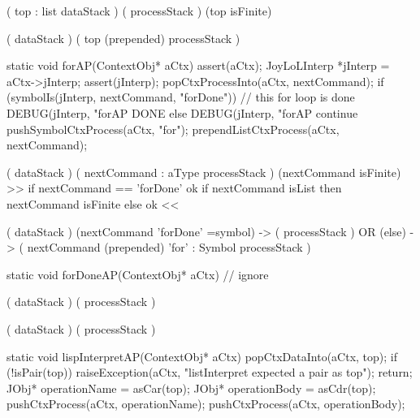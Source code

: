 \starttyping

\startWord[interpret]

\preDataStack
  (
    top : list
    dataStack
  )
\preProcessStack
  (
    processStack
  )
\preConditions
  (top isFinite)
\stopPreStack

\postDataStack
  (
    dataStack
  )
\postProcessStack
  (
    top (prepended)
    processStack
  )
\postConditions
\stopPostStack

\stopWord

\stoptyping

\startCCode
static void forAP(ContextObj* aCtx) {
  assert(aCtx);
  JoyLoLInterp *jInterp = aCtx->jInterp;
  assert(jInterp);
  popCtxProcessInto(aCtx, nextCommand);
  if (symbolIs(jInterp, nextCommand, "forDone")) {
    // this for loop is done
    DEBUG(jInterp, "forAP DONE%
  } else {
    DEBUG(jInterp, "forAP continue%
    pushSymbolCtxProcess(aCtx, "for");
    prependListCtxProcess(aCtx, nextCommand);
  }
}
\stopCCode

\starttyping

\startWord[for]
\preDataStack
  (
    dataStack
  )
\preProcessStack
  (
    nextCommand : aType
    processStack
  )
\preConditions
  (nextCommand isFinite)  >> if nextCommand == 'forDone' ok
                             if nextCommand isList then nextCommand isFinite
                             else ok <<
\stopPreStack

\postDataStack
  (
    dataStack
  )
\postProcessStack
  (nextCommand 'forDone' =symbol) -> (
    processStack
  )
  OR
  (else) -> (
    nextCommand (prepended)
    'for' : Symbol
    processStack
  )
\postConditions
\stopPostStack

\stopWord

\stoptyping

\startCCode
static void forDoneAP(ContextObj* aCtx) {
  // ignore
}
\stopCCode

\starttyping

\startWord[forDone]

\preDataStack
  ( dataStack )
\preProcessStack
  ( processStack )
\preConditions
\stopPreStack

\postDataStack
  ( dataStack )
\postProcessStack
  ( processStack )
\postConditions
\stopPostStack

\stopWord

\stoptyping

\startCCode
static void lispInterpretAP(ContextObj* aCtx) {
  popCtxDataInto(aCtx, top);
  if (!isPair(top)) {
    raiseException(aCtx,
      "listInterpret expected a pair as top");
    return;
  }
  JObj* operationName = asCar(top);
  JObj* operationBody = asCdr(top);
  pushCtxProcess(aCtx, operationName);
  pushCtxProcess(aCtx, operationBody);
}
\stopCCode

